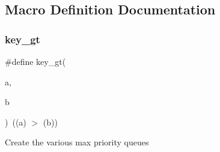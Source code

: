 \subsection{Macro Definition Documentation}
\mbox{\label{a00128_a89b02dbc0bd6ec64351eff7c65c6440e}} 
\subsubsection{\texorpdfstring{key\+\_\+gt}{key\_gt}}
{\footnotesize\ttfamily \#define key\+\_\+gt(\begin{DoxyParamCaption}\item[{}]{a,  }\item[{}]{b }\end{DoxyParamCaption})~((a) $>$ (b))}

Create the various max priority queues 